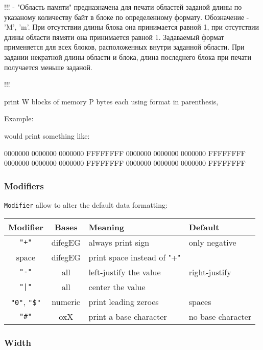 \ifcomment !!!
 - "Область памяти" предназначена для печати областей заданой длины
   по указаному количеству байт в блоке по определенному формату.
   Обозначение - 'M', 'm'. При отсутствии длины блока она принимается
   равной 1, при отсутствии длины области пямяти она принимается равной 1.
   Задаваемый формат применяется для всех блоков, расположенных внутри
   заданной области. При задании некратной длины области и блока, длина
   последнего блока при печати получается меньше заданой.

!!!


print W blocks of memory P bytes each using format in parenthesis,

Example:


would print something like:

0000000 0000000 0000000 FFFFFFFF
0000000 0000000 0000000 FFFFFFFF
0000000 0000000 0000000 FFFFFFFF
0000000 0000000 0000000 FFFFFFFF

\fi

\subsubsection{Modifiers}

\verb'Modifier' allow to alter the default data formatting:

\begin{tabular}{c|c|l|l}
\bf Modifier & \bf Bases & \bf Meaning                   & \bf Default \\
\hline
 \verb'"+"' & difegEG & always print sign                & only negative     \\
   space    & difegEG & print space instead of "+"       &                   \\
 \verb'"-"' & all     & left-justify the value           & right-justify     \\
 \verb'"|"' & all     & center the value                 &                   \\
 \verb'"0"', \verb'"$"' & numeric & print leading zeroes             & spaces            \\
 \verb'"#"' & oxX     & print a base character           & no base character
\end{tabular}

\subsubsection{Width}


